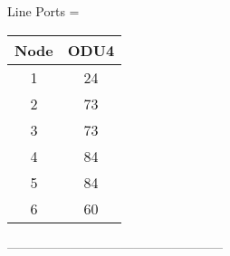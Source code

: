 \vspace{11pt}

Line Ports = \\


\begin{tabular}{|c|c|}
  \hline
  Node & ODU4 \\
  \hline\hline
  1 & 24 \\
  2 & 73 \\
  3 & 73 \\
  4 & 84 \\
  5 & 84 \\
  6 & 60 \\
  \hline
\end{tabular}

\vspace{11pt}

---------------------------------------------------\\

